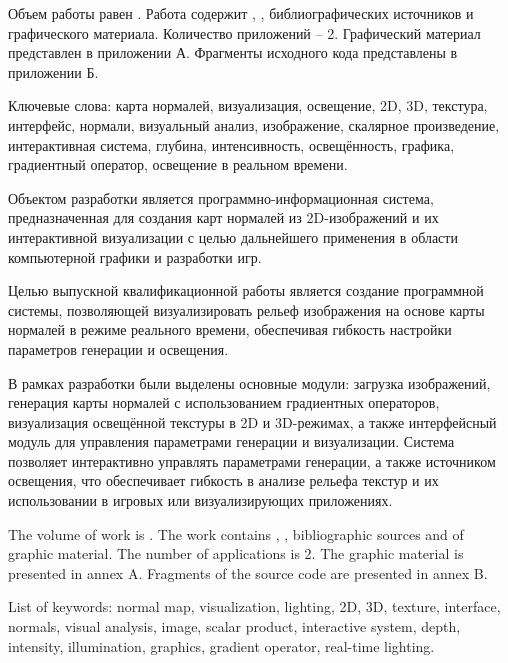 
Объем работы равен . Работа содержит , ,  библиографических источников и  графического материала. Количество приложений -- 2. Графический материал представлен в приложении А. Фрагменты исходного кода представлены в приложении Б.

Ключевые слова: карта нормалей, визуализация, освещение, 2D, 3D, текстура, интерфейс, нормали, визуальный анализ, изображение, скалярное произведение, интерактивная система, глубина, интенсивность, освещённость, графика, градиентный оператор, освещение в реальном времени.

Объектом разработки является программно-информационная система, предназначенная для создания карт нормалей из 2D-изображений и их интерактивной визуализации с целью дальнейшего применения в области компьютерной графики и разработки игр.

Целью выпускной квалификационной работы является создание программной системы, позволяющей визуализировать рельеф изображения на основе карты нормалей в режиме реального времени, обеспечивая гибкость настройки параметров генерации и освещения.

В рамках разработки были выделены основные модули: загрузка изображений, генерация карты нормалей с использованием градиентных операторов, визуализация освещённой текстуры в 2D и 3D-режимах, а также интерфейсный модуль для управления параметрами генерации и визуализации. Система позволяет интерактивно управлять параметрами генерации, а также источником освещения, что обеспечивает гибкость в анализе рельефа текстур и их использовании в игровых или визуализирующих приложениях.

  
The volume of work is . The work contains , ,  bibliographic sources and  of graphic material. The number of applications is 2. The graphic material is presented in annex A. Fragments of the source code are presented in annex B.

List of keywords: normal map, visualization, lighting, 2D, 3D, texture, interface, normals, visual analysis, image, scalar product, interactive system, depth, intensity, illumination, graphics, gradient operator, real-time lighting.

